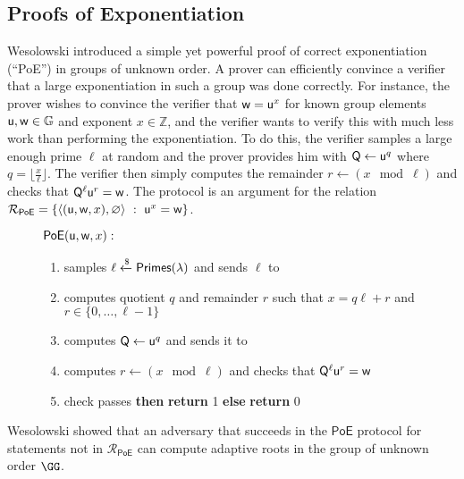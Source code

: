 \documentclass{article}
\theoremstyle{definition}
\begin{document}
\subsection{Proofs of Exponentiation}
Wesolowski \cite{EC:Wesolowski19} introduced a simple yet powerful proof of correct exponentiation (``PoE'') in groups of unknown order. A prover can efficiently convince a verifier that a large exponentiation in such a group was done correctly. For instance, the prover wishes to convince the verifier that $\mathsf{w} = \mathsf{u}^x$ for known group elements $\mathsf{u}, \mathsf{w} \in \mathbb{G}$ and exponent $x \in \mathbb{Z}$, and the verifier wants to verify this with much less work than performing the exponentiation. To do this, the verifier samples a large enough prime $\ell$ at random and the prover provides him with $\mathsf{Q} \gets \mathsf{u}^q$ where $q = \lfloor \frac{x}{\ell} \rfloor$. The verifier then simply computes the remainder $r \gets (x \mod \ell)$ and checks that $\mathsf{Q}^\ell\mathsf{u}^r = \mathsf{w}$. The protocol is an argument for the relation $\mathcal{R}_\mathsf{PoE} = \left\{ \langle(\mathsf{u}, \mathsf{w}, x), \varnothing\rangle \ : \ \mathsf{u}^x = \mathsf{w} \right\}$.

\begin{figure}[!htp]
\noindent\begin{mdframed}[userdefinedwidth=\textwidth]
\begin{minipage}{\textwidth}
	\begin{flushleft}
	$\textsf{{PoE}}(\mathsf{u}, \mathsf{w}, x):$
	\begin{enumerate}[nolistsep]
		    \item \verifier samples $\ell \xleftarrow{\$} \textsf{Primes}(\lambda)$ and sends $\ell$ to \prover
		    \item \prover computes quotient $q$ and remainder $r$ such that $x = q\ell + r$ and $r \in \{0, \ldots, \ell-1\}$
		    \item \prover computes $\mathsf{Q} \gets \mathsf{u}^q$ and sends it to \verifier
		    \item \verifier computes $r \gets (x \mod \ell)$ and checks that $\mathsf{Q}^\ell\mathsf{u}^r = \mathsf{w}$
		    \item \pcif{}check passes \textbf{then} \textbf{return} 1 \textbf{else} \textbf{return} 0
		\end{enumerate}
	\end{flushleft}
\end{minipage}
\end{mdframed}
\end{figure}
Wesolowski showed that an adversary that succeeds in the $\textsf{PoE}$ protocol for statements not in $\mathcal{R}_{\textsf{PoE}}$ can compute adaptive roots in the group of unknown order $\GG$.
\end{document}
